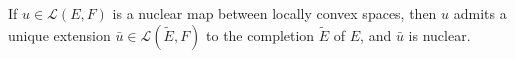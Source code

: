 If $u \in \mathcal{L}(E, F)$ is a nuclear map between locally convex spaces, then $u$ admits a unique extension $\bar{u} \in \mathcal{L}(\tilde{E}, F)$ to the completion $\tilde{E}$ of $E$, and $\bar{u}$ is nuclear.
